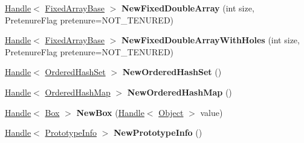 \begin{DoxyCompactItemize}
\item 
\hyperlink{classv8_1_1internal_1_1_handle}{Handle}$<$ \hyperlink{classv8_1_1internal_1_1_fixed_array_base}{Fixed\+Array\+Base} $>$ {\bfseries New\+Fixed\+Double\+Array} (int size, Pretenure\+Flag pretenure=N\+O\+T\+\_\+\+T\+E\+N\+U\+R\+ED)\hypertarget{classv8_1_1internal_1_1_factory_af7e95e8d79c01ba08a1a5bda00053886}{}\label{classv8_1_1internal_1_1_factory_af7e95e8d79c01ba08a1a5bda00053886}

\item 
\hyperlink{classv8_1_1internal_1_1_handle}{Handle}$<$ \hyperlink{classv8_1_1internal_1_1_fixed_array_base}{Fixed\+Array\+Base} $>$ {\bfseries New\+Fixed\+Double\+Array\+With\+Holes} (int size, Pretenure\+Flag pretenure=N\+O\+T\+\_\+\+T\+E\+N\+U\+R\+ED)\hypertarget{classv8_1_1internal_1_1_factory_aedd059961170135791a38d126ec4f8fd}{}\label{classv8_1_1internal_1_1_factory_aedd059961170135791a38d126ec4f8fd}

\item 
\hyperlink{classv8_1_1internal_1_1_handle}{Handle}$<$ \hyperlink{classv8_1_1internal_1_1_ordered_hash_set}{Ordered\+Hash\+Set} $>$ {\bfseries New\+Ordered\+Hash\+Set} ()\hypertarget{classv8_1_1internal_1_1_factory_a912e53bcc0bf576897691b77f4a353cd}{}\label{classv8_1_1internal_1_1_factory_a912e53bcc0bf576897691b77f4a353cd}

\item 
\hyperlink{classv8_1_1internal_1_1_handle}{Handle}$<$ \hyperlink{classv8_1_1internal_1_1_ordered_hash_map}{Ordered\+Hash\+Map} $>$ {\bfseries New\+Ordered\+Hash\+Map} ()\hypertarget{classv8_1_1internal_1_1_factory_aa4664bf7567b848c542e740f44d70b5c}{}\label{classv8_1_1internal_1_1_factory_aa4664bf7567b848c542e740f44d70b5c}

\item 
\hyperlink{classv8_1_1internal_1_1_handle}{Handle}$<$ \hyperlink{classv8_1_1internal_1_1_box}{Box} $>$ {\bfseries New\+Box} (\hyperlink{classv8_1_1internal_1_1_handle}{Handle}$<$ \hyperlink{classv8_1_1internal_1_1_object}{Object} $>$ value)\hypertarget{classv8_1_1internal_1_1_factory_ac6893001118a4a872fd5d0b14663f032}{}\label{classv8_1_1internal_1_1_factory_ac6893001118a4a872fd5d0b14663f032}

\item 
\hyperlink{classv8_1_1internal_1_1_handle}{Handle}$<$ \hyperlink{classv8_1_1internal_1_1_prototype_info}{Prototype\+Info} $>$ {\bfseries New\+Prototype\+Info} ()\hypertarget{classv8_1_1internal_1_1_factory_a619671bbe685d91554c5efff01c602bb}{}\label{classv8_1_1internal_1_1_factory_a619671bbe685d91554c5efff01c602bb}


\end{DoxyCompactItemize}
